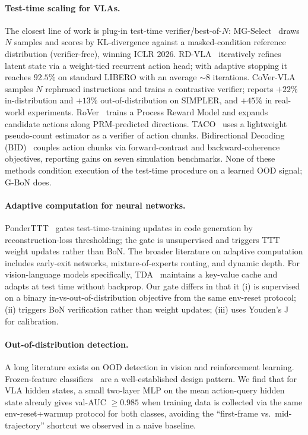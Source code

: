 \documentclass{article}
\begin{document}
\paragraph{Test-time scaling for VLAs.}
The closest line of work is plug-in test-time
verifier/best-of-$N$:
MG-Select~\citep{mgselect2026} draws $N$ samples and scores by
KL-divergence against a masked-condition reference distribution
(verifier-free), winning ICLR 2026.
RD-VLA~\citep{rdvla2025} iteratively refines latent state via a
weight-tied recurrent action head; with adaptive stopping it reaches
$92.5\%$ on standard LIBERO with an average $\sim 8$ iterations.
CoVer-VLA~\citep{cover_vla2025} samples $N$ rephrased instructions and
trains a contrastive verifier; reports $+22\%$ in-distribution and
$+13\%$ out-of-distribution on SIMPLER, and $+45\%$ in real-world
experiments.
RoVer~\citep{rover2026} trains a Process Reward Model and expands
candidate actions along PRM-predicted directions.
TACO~\citep{taco2026} uses a lightweight pseudo-count estimator as a
verifier of action chunks.
Bidirectional Decoding (BID)~\citep{bid2024} couples action chunks via
forward-contrast and backward-coherence objectives, reporting gains on
seven simulation benchmarks.
None of these methods condition execution of the test-time procedure
on a learned OOD signal; G-BoN does.

\paragraph{Adaptive computation for neural networks.}
PonderTTT~\citep{pondertt} gates test-time-training updates in code
generation by reconstruction-loss thresholding; the gate is
unsupervised and triggers TTT weight updates rather than BoN. The
broader literature on adaptive computation includes early-exit networks,
mixture-of-experts routing, and dynamic depth. For vision-language
models specifically, TDA~\citep{tda2024} maintains a key-value cache and
adapts at test time without backprop. Our gate differs in that it
(i) is supervised on a binary in-vs-out-of-distribution objective from
the same env-reset protocol;
(ii) triggers BoN verification rather than weight updates;
(iii) uses Youden's J~\citep{youden1950} for calibration.

\paragraph{Out-of-distribution detection.}
A long literature exists on OOD detection in vision and reinforcement
learning. Frozen-feature classifiers~\citep{robust_unsupervised_ood2024}
are a well-established design pattern. We find that for VLA hidden
states, a small two-layer MLP on the mean action-query hidden state
already gives val-AUC $\geq 0.985$ when training data is collected via
the same env-reset+warmup protocol for both classes, avoiding the
``first-frame vs.\ mid-trajectory'' shortcut we observed in a
naive baseline.
\end{document}
